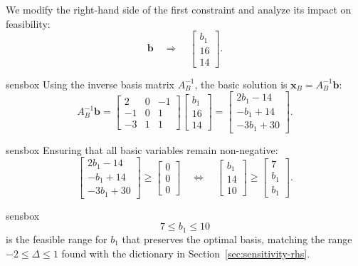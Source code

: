 We modify the right-hand side of the first constraint and analyze its impact on feasibility:
\[
\mathbf{b} \quad \Rightarrow \quad \begin{bmatrix} b_1 \\ 16 \\ 14 \end{bmatrix}.
\]

\begin{steppanel}{sensbox}
Using the inverse basis matrix \( A_B^{-1} \), the basic solution is \( \mathbf{x}_B = A_B^{-1} \mathbf{b} \):
\[
A_B^{-1} \mathbf{b} = \begin{bmatrix}
2 & 0 & -1\\
-1 & 0 & 1\\
-3 & 1 & 1
\end{bmatrix} \begin{bmatrix} b_1\\ 16\\ 14 \end{bmatrix}
=
\begin{bmatrix}
2b_1 - 14\\
-b_1 + 14\\
-3b_1 + 30
\end{bmatrix}.
\]
\end{steppanel}

\begin{steppanel}{sensbox}
Ensuring that all basic variables remain non-negative:
\[
\begin{bmatrix}
2b_1 - 14\\
-b_1 + 14\\
-3b_1 + 30
\end{bmatrix} \geq
\begin{bmatrix}
0\\
0\\
0
\end{bmatrix}
\quad\Longleftrightarrow\quad
\begin{bmatrix}
b_1 \\
14\\
10
\end{bmatrix} \geq
\begin{bmatrix}
7\\
b_1\\
b_1
\end{bmatrix}.
\]
\end{steppanel}

\begin{steppanel}{sensbox}
\[
\boxed{7 \leq b_1 \leq 10}
\]
is the feasible range for \( b_1 \) that preserves the optimal basis, matching the range \( -2 \le \Delta \le 1 \) found with the dictionary in Section~\ref{sec:sensitivity-rhs}.
\end{steppanel}

